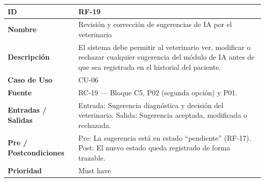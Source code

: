 \documentclass[
]{article}
\newcounter{none} %
\begin{document}
{\def\LTcaptype{none} %
\begin{longtable}[]{|
  >{\raggedright\arraybackslash}p{}|
  >{\raggedright\arraybackslash}p{}|}
\hline
\begin{minipage}[b]{\linewidth}\raggedright
\textbf{ID}
\end{minipage} & \begin{minipage}[b]{\linewidth}\raggedright
RF-19
\end{minipage} \\
\hline
\endhead
\hline
\endlastfoot
\textbf{Nombre} & \begin{minipage}[t]{\linewidth}\raggedright
Revisión y corrección de sugerencias de IA por el veterinario
\end{minipage} \\
\hline
\textbf{Descripción} & \begin{minipage}[t]{\linewidth}\raggedright
El sistema debe permitir al veterinario ver, modificar o rechazar cualquier sugerencia del módulo de IA antes de que sea registrada en el historial del paciente.
\end{minipage} \\
\hline
\textbf{Caso de Uso} & \begin{minipage}[t]{\linewidth}\raggedright
CU-06
\end{minipage} \\
\hline
\textbf{Fuente} & \begin{minipage}[t]{\linewidth}\raggedright
RC-19 — Bloque C5, P02 (segunda opción) y P01.
\end{minipage} \\
\hline
\textbf{Entradas / Salidas} & \begin{minipage}[t]{\linewidth}\raggedright
Entrada: Sugerencia diagnóstica y decisión del veterinario. Salida: Sugerencia aceptada, modificada o rechazada.
\end{minipage} \\
\hline
\textbf{Pre / Postcondiciones} & \begin{minipage}[t]{\linewidth}\raggedright
Pre: La sugerencia está en estado “pendiente” (RF-17). Post: El nuevo estado queda registrado de forma trazable.
\end{minipage} \\
\hline
\textbf{Prioridad} & \begin{minipage}[t]{\linewidth}\raggedright
Must have
\end{minipage} \\

\end{longtable}}
\end{document}
